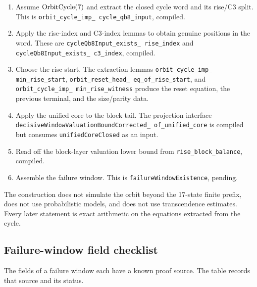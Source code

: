 \begin{enumerate}[leftmargin=*]
\item Assume $\mathrm{OrbitCycle}(7)$ and extract the closed cycle word and
  its rise/C3 split.  This is
  \texttt{orbit\_\allowbreak cycle\_\allowbreak imp\_\allowbreak
  cycle\_\allowbreak qb8\_\allowbreak input}, compiled.
\item Apply the rise-index and C3-index lemmas to obtain genuine
  positions in the word.  These are
  \texttt{cycleQb8Input\_\allowbreak exists\_\allowbreak
  rise\_\allowbreak index} and
  \texttt{cycleQb8Input\_\allowbreak exists\_\allowbreak
  c3\_\allowbreak index}, compiled.
\item Choose the rise start.  The extraction lemmas
  \texttt{orbit\_\allowbreak cycle\_\allowbreak imp\_\allowbreak
  min\_\allowbreak rise\_\allowbreak start},
  \texttt{orbit\_\allowbreak reset\_\allowbreak head\_\allowbreak
  eq\_\allowbreak of\_\allowbreak rise\_\allowbreak start}, and
  \texttt{orbit\_\allowbreak cycle\_\allowbreak imp\_\allowbreak
  min\_\allowbreak rise\_\allowbreak witness} produce the reset
  equation, the previous terminal, and the size/parity data.
\item Apply the unified core to the block tail.  The projection
  interface
  \texttt{decisiveWindowValuationBoundCorrected\_\allowbreak
  of\_\allowbreak unified\_\allowbreak core} is compiled but consumes
  \texttt{unifiedCoreClosed} as an input.
\item Read off the block-layer valuation lower bound from
  \texttt{rise\_\allowbreak block\_\allowbreak balance}, compiled.
\item Assemble the failure window.  This is
  \texttt{failureWindowExistence}, pending.
\end{enumerate}

The construction does not simulate the orbit beyond the 17-state
finite prefix, does not use probabilistic models, and does not use
transcendence estimates.  Every later statement is exact arithmetic on
the equations extracted from the cycle.

\subsection{Failure-window field checklist}

The fields of a failure window each have a known proof source.  The
table records that source and its status.

